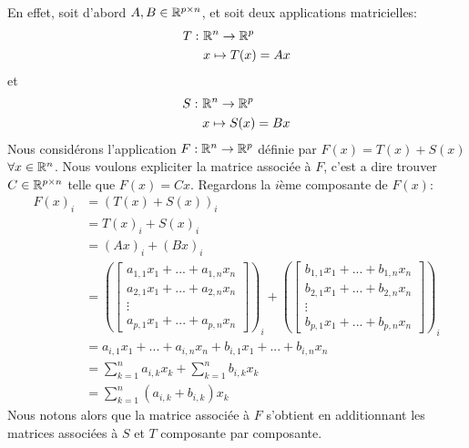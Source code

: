 \noindent En effet, soit d'abord $A,B \in \mathbb{R}^{p \times n}$, et soit deux applications matricielles:
\begin{align*}
    T: \ &\mathbb{R}^n \to \mathbb{R}^p\\
    &x \mapsto T(x) = Ax
\end{align*}
et 
\begin{align*}
    S: \ &\mathbb{R}^n \to \mathbb{R}^p\\
    &x \mapsto S(x) = Bx
\end{align*}
Nous considérons l'application $F: \mathbb{R}^n \to \mathbb{R}^p$ définie par $F(x) = T(x) + S(x)$ $\forall x \in \mathbb{R}^n$. Nous voulons expliciter la matrice associée à $F$, c'est a dire trouver $C \in \mathbb{R}^{p \times n}$ telle que $F(x) = Cx$. Regardons la $i$ème composante de $F(x)$:
\begin{align*}
    F(x)_i &= (T(x) + S(x))_i \\
    &= T(x)_i + S(x)_i \\
    &= (Ax)_i + (Bx)_i \\
    &= \left(\begin{bmatrix} a_{1,1}x_1 +  ... + a_{1, n}x_n \\ a_{2,1}x_1 +  ... + a_{2, n}x_n \\ \vdots \\ a_{p,1}x_1 + ... + a_{p, n}x_n \end{bmatrix}\right)_i + \left(\begin{bmatrix} b_{1,1}x_1 +  ... + b_{1, n}x_n \\ b_{2,1}x_1 +  ... + b_{2, n}x_n \\ \vdots \\ b_{p,1}x_1 + ... + b_{p, n}x_n \end{bmatrix}\right)_i \\
    &= a_{i,1}x_1 +  ... + a_{i, n}x_n + b_{i,1}x_1 + ... + b_{i, n}x_n \\
    &= \sum_{k=1}^{n} a_{i,k} x_k + \sum_{k=1}^{n} b_{i,k} x_k \\
    &= \sum_{k=1}^{n} (a_{i,k} + b_{i,k}) x_k
\end{align*} %
\noindent Nous notons alors que la matrice associée à $F$ s'obtient en additionnant les matrices associées à $S$ et $T$ composante par composante. \\

